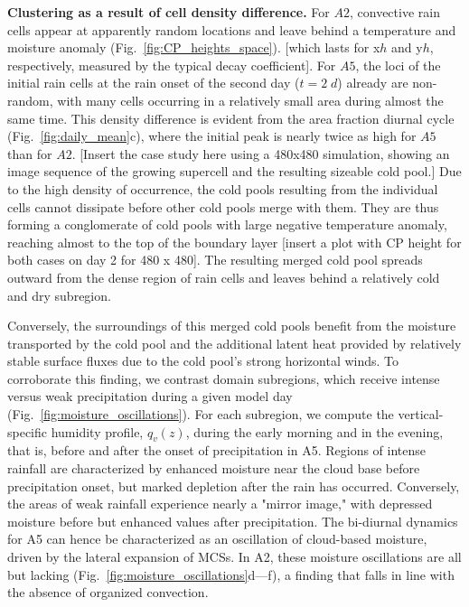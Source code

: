 \documentclass[draft,linenumbers]{agujournal2019}
\begin{document}
\noindent
{\bf Clustering as a result of cell density difference.}
For $A2$, convective rain cells appear at apparently random locations and leave behind a temperature and moisture anomaly (Fig.~\ref{fig:CP_heights_space}). 
[which lasts for x$h$ and y$h$, respectively, measured by the typical decay coefficient].
For $A5$, the loci of the initial rain cells at the rain onset of the second day ($t=2\;d$) already are non-random, with many cells occurring in a relatively small area during almost the same time. 
This density difference is evident from the area fraction diurnal cycle (Fig.~\ref{fig:daily_mean}c), where the initial peak is nearly twice as high for $A5$ than for $A2$. 
[Insert the case study here using a 480x480 simulation, showing an image sequence of the growing supercell and the resulting sizeable cold pool.]
Due to the high density of occurrence, the cold pools resulting from the individual cells cannot dissipate before other cold pools merge with them.
They are thus forming a conglomerate of cold pools with large negative temperature anomaly, reaching almost to the top of the boundary layer [insert a plot with CP height for both cases on day 2 for 480 x 480].
The resulting merged cold pool spreads outward from the dense region of rain cells and leaves behind a relatively cold and dry subregion.

Conversely, the surroundings of this merged cold pools benefit from the moisture transported by the cold pool and the additional latent heat provided by relatively stable surface fluxes due to the cold pool's strong horizontal winds.
To corroborate this finding, we contrast domain subregions, which receive intense versus weak precipitation during a given model day (Fig.~\ref{fig:moisture_oscillations}).
For each subregion, we compute the vertical-specific humidity profile, $q_v(z)$, during the early morning and in the evening, that is, before and after the onset of precipitation in A5.
Regions of intense rainfall are characterized by enhanced moisture near the cloud base before precipitation onset, but marked depletion after the rain has occurred.
Conversely, the areas of weak rainfall experience nearly a "mirror image," with depressed moisture before but enhanced values after precipitation.
The bi-diurnal dynamics for A5 can hence be characterized as an oscillation of cloud-based moisture, driven by the lateral expansion of MCSs.
In A2, these moisture oscillations are all but lacking (Fig.~\ref{fig:moisture_oscillations}d---f), a finding that falls in line with the absence of organized convection.
\end{document}
